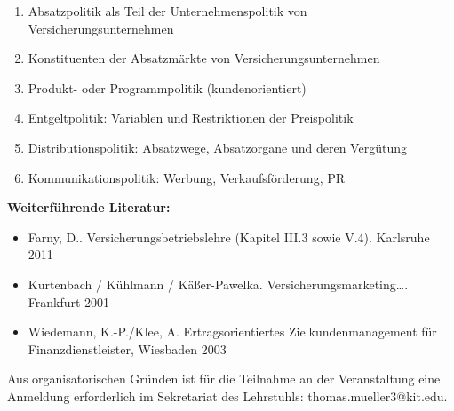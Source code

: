 \begin{course}
\begin{content}
\begin{enumerate}\item Absatzpolitik als Teil der Unternehmenspolitik von Versicherungsunternehmen  \item Konstituenten der Absatzmärkte von Versicherungsunternehmen  \item Produkt- oder Programmpolitik (kundenorientiert)  \item Entgeltpolitik: Variablen und Restriktionen der Preispolitik  \item Distributionspolitik: Absatzwege, Absatzorgane und deren Vergütung  \item Kommunikationspolitik: Werbung, Verkaufsförderung, PR  \end{enumerate}
\end{content}



\begin{literature}\textbf{Weiterführende Literatur:}

 \begin{itemize}\item Farny, D.. Versicherungsbetriebslehre (Kapitel III.3 sowie V.4). Karlsruhe 2011  \item Kurtenbach / Kühlmann / Käßer-Pawelka. Versicherungsmarketing…. Frankfurt 2001  \item Wiedemann, K.-P./Klee, A. Ertragsorientiertes Zielkundenmanagement für Finanzdienstleister, Wiesbaden 2003  \end{itemize}\end{literature}

\begin{remarks}Aus organisatorischen Gründen ist für die Teilnahme an der Veranstaltung eine Anmeldung erforderlich im Sekretariat des Lehrstuhls: thomas.mueller3@kit.edu.

\end{remarks}

\end{course}